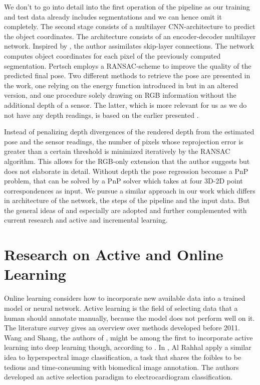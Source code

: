 We don't to go into detail into the first operation of the pipeline as our training and test data already includes segmentations and we can hence omit it completely. The second stage consists of a multilayer CNN-architecture to predict the object coordinates. The architecture consists of an encoder-decoder multilayer network. Inspired by \cite{oronneberger}, the author assimilates skip-layer connections. The network computes object coordinates for each pixel of the previously computed segmentation. Pertsch employs a RANSAC-scheme to improve the quality of the predicted final pose. Two different methods to retrieve the pose are presented in the work, one relying on the energy function introduced in \cite{brachmann1} but in an altered version, and one procedure solely drawing on RGB information without the additional depth of a sensor. The latter, which is more relevant for us as we do not have any depth readings, is based on the earlier presented \cite{brachmann2}. 

Instead of penalizing depth divergences of the rendered depth from the estimated pose and the sensor readings, the number of pixels whose reprojection error is greater than a certain threshold is minimized iteratively by the RANSAC algorithm. This allows for the RGB-only extension that the author suggests but does not elaborate in detail. Without depth the pose regression becomse a PnP problem, that can be solved by a PnP solver which takes at  four 3D-2D point correspondences as input. We pursue a similar approach in our work which differs in architecture of the network, the steps of the pipeline and the input data. But the general ideas of \cite{pertsch} and especially \cite{brachmann1} are adopted and further complemented with current research and active and incremental learning.

\section{Research on Active and Online Learning}

Online learning considers how to incorporate new available data into a trained model or neural network. Active learning is the field of selecting data that a human should annotate manually, because the model does not perform well on it. The literature survey \cite{activesurvey} gives an overview over methods developed before 2011. Wang and Shang, the authors of \cite{dwang}, might be among the first to incorporate active learning into deep learning though, according to \cite{zhou}. In \cite{hyperspectral}, Al Rahhal \etal apply a similar idea to hyperspectral image classification, a task that shares the foibles to be tedious and time-consuming with biomedical image annotation. The authors developed an active selection paradigm to electrocardiogram classification. 

